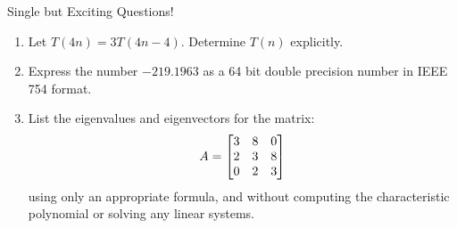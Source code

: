 \documentclass[10pt,twoside,openany]{memoir}
\begin{document}
    \begin{exercise}
        Single but Exciting Questions!
        \begin{enumerate}[label = (\alph*),itemsep=1pt,topsep=3pt]
            \item Let $T(4n) = 3T(4n-4)$. Determine $T(n)$ explicitly.
            \item Express the number $-219.1963$ as a 64 bit double precision number in IEEE 754 format.
            \item List the eigenvalues and eigenvectors for the matrix:
                \begin{equation*}
                \begin{split}
                    A = \left[ \begin{matrix} 3 & 8 & 0 \\ 2 & 3 & 8 \\ 0 & 2 & 3 \end{matrix} \right]
                \end{split}
                \end{equation*}
            using only an appropriate formula, and without computing the characteristic polynomial or solving any linear systems.
        \end{enumerate}
    \end{exercise}
\end{document}
